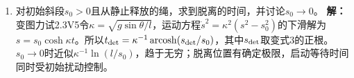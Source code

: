 \documentclass[UTF8,fontset=fandol,a4paper,11pt]{ctexart}
\begin{document}
\begin{enumerate}
\item 对初始斜段$s_0>0$且从静止释放的绳，求到脱离的时间，并讨论$s_0\to0$。
\textbf{解：}变图力试2.3V5令$\kappa=\sqrt{g\sin\theta/l}$，运动方程$\dot s^2=\kappa^2(s^2-s_0^2)$的下滑解为$s=s_0\cosh\kappa t$。所以$t_{\rm det}=\kappa^{-1}\operatorname{arcosh}(s_{\rm det}/s_0)$，其中$s_{\rm det}$取变式3的正根。$s_0\to0$时近似$\kappa^{-1}\ln(l/s_0)$，趋于无穷；脱离位置有确定极限，启动等待时间同时受初始扰动控制。
\begin{center}\begin{minipage}{.98\linewidth}\centering
{}
\end{minipage}
\end{center}
\end{enumerate}
\end{document}
